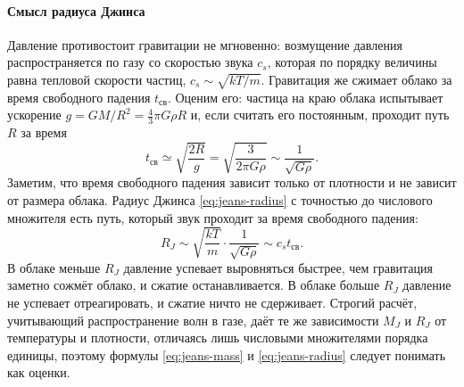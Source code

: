 \paragraph{Смысл радиуса Джинса} Давление противостоит гравитации не мгновенно: возмущение давления распространяется по газу со скоростью звука $c_s$, которая по порядку величины равна тепловой скорости частиц, $c_s \sim \sqrt{kT / m}$. Гравитация же сжимает облако за время свободного падения $t_\text{св}$. Оценим его: частица на краю облака испытывает ускорение $g = GM / R^2 = \frac{4}{3}\pi G \rho R$ и, если считать его постоянным, проходит путь $R$ за время
\begin{equation*}
    t_\text{св} \simeq \sqrt{\frac{2R}{g}} = \sqrt{\frac{3}{2\pi G \rho}} \sim \frac{1}{\sqrt{G\rho}}.
\end{equation*}
Заметим, что время свободного падения зависит только от плотности и не зависит от размера облака. Радиус Джинса \eqref{eq:jeans-radius} с точностью до числового множителя есть путь, который звук проходит за время свободного падения:
\begin{equation*}
    R_J \sim \sqrt{\frac{kT}{m}} \cdot \frac{1}{\sqrt{G\rho}} \sim c_s t_\text{св}.
\end{equation*}
В облаке меньше $R_J$ давление успевает выровняться быстрее, чем гравитация заметно сожмёт облако, и сжатие останавливается. В облаке больше $R_J$ давление не успевает отреагировать, и сжатие ничто не сдерживает. Строгий расчёт, учитывающий распространение волн в газе, даёт те же зависимости $M_J$ и $R_J$ от температуры и плотности, отличаясь лишь числовыми множителями порядка единицы, поэтому формулы \eqref{eq:jeans-mass} и \eqref{eq:jeans-radius} следует понимать как оценки.


